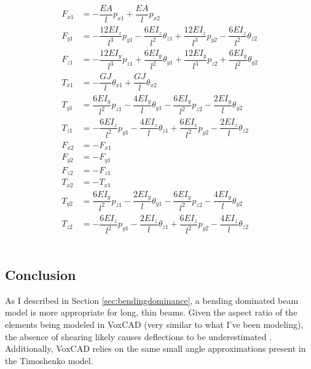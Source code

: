 {\begin{subequations}
\begin{align} 
\label{eq:fx1vox}
F_{x1} &=  -\dfrac{EA}{l}p_{x1} + \dfrac{EA}{l}p_{x2} \\[10pt]
\label{eq:fy1vox}
F_{y1} &=  -\dfrac{12EI_z}{l^3}p_{y1} - \dfrac{6EI_z}{l^2}\theta_{z1} + \dfrac{12EI_z}{l^3}p_{y2} - \dfrac{6EI_z}{l^2}\theta_{z2}\\[10pt]
\label{eq:fz1vox}
F_{z1} &= - \dfrac{12EI_y}{l^3}p_{z1} + \dfrac{6EI_y}{l^2}\theta_{y1} + \dfrac{12EI_y}{l^3}p_{z2} + \dfrac{6EI_y}{l^2}\theta_{y2}\\[10pt]
\label{eq:tx1vox}
T_{x1} &=  -\dfrac{GJ}{l}\theta_{x1} + \dfrac{GJ}{l}\theta_{x2} \\[10pt]
\label{eq:ty1vox}
T_{y1} &= \dfrac{6EI_y}{l^2}p_{z1} - \dfrac{4EI_y}{l}\theta_{y1}  - \dfrac{6EI_y}{l^2}p_{z2} - \dfrac{2EI_y}{l}\theta_{y2} \\[10pt]
\label{eq:tz1vox}
T_{z1} &=  -\dfrac{6EI_z}{l^2}p_{y1} - \dfrac{4EI_z}{l}\theta_{z1}  + \dfrac{6EI_z}{l^2}p_{y2} - \dfrac{2EI_z}{l}\theta_{z2} \\[10pt]
\label{eq:fx2vox}
F_{x2} &=  -F_{x1}\\[10pt]
\label{eq:fy2vox}
F_{y2} &=  -F_{y1}\\[10pt]
\label{eq:fz2vox}
F_{z2} &=  -F_{z1}\\[10pt]
\label{eq:tx2vox}
T_{x2} &=  -T_{x1}\\[10pt]
\label{eq:ty2vox}
T_{y2} &=  \dfrac{6EI_y}{l^2}p_{z1} - \dfrac{2EI_y}{l}\theta_{y1}  - \dfrac{6EI_y}{l^2}p_{z2} - \dfrac{4EI_y}{l}\theta_{y2} \\[10pt]
\label{eq:tz2vox}
T_{z2} &= -\dfrac{6EI_z}{l^2}p_{y1} - \dfrac{2EI_z}{l}\theta_{z1}  + \dfrac{6EI_z}{l^2}p_{y2} - \dfrac{4EI_z}{l}\theta_{z2}
\end{align}
\end{subequations}\\

\subsection{Conclusion}

As I described in Section \ref{sec:bendingdominance}, a bending dominated beam model is more appropriate for long, thin beams.   Given the aspect ratio of the elements being modeled in VoxCAD (very similar to what I've been modeling), the absence of shearing likely causes deflections to be underestimated \cite{Bower2009}.  Additionally, VoxCAD relies on the same small angle approximations present in the Timoshenko model.\\

}

